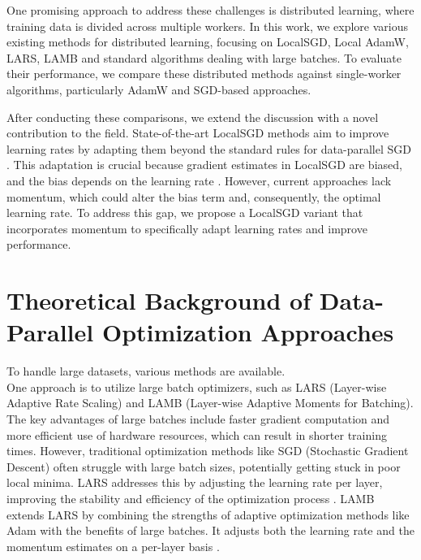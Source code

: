 \documentclass[10pt,twocolumn,letterpaper]{article}
\begin{document}
One promising approach to address these challenges is distributed learning, where training data is divided across multiple workers. In this work, we explore various existing methods for distributed learning, focusing on LocalSGD, Local AdamW, LARS, LAMB and standard algorithms dealing with large batches. To evaluate their performance, we compare these distributed methods against single-worker algorithms, particularly AdamW and SGD-based approaches.

After conducting these comparisons, we extend the discussion with a novel contribution to the field. State-of-the-art LocalSGD methods aim to improve learning rates by adapting them beyond the standard rules for data-parallel SGD \cite{BALLES2024P}. This adaptation is crucial because gradient estimates in LocalSGD are biased, and the bias depends on the learning rate \cite{BALLES2024P}. However, current approaches lack momentum, which could alter the bias term and, consequently, the optimal learning rate. To address this gap, we propose a LocalSGD variant that incorporates momentum to specifically adapt learning rates and improve performance.


\section{Theoretical Background of Data-Parallel Optimization Approaches}

To handle large datasets, various methods are available.\\
One approach is to utilize large batch optimizers, such as LARS (Layer-wise Adaptive Rate Scaling) and LAMB (Layer-wise Adaptive Moments for Batching). The key advantages of large batches include faster gradient computation and more efficient use of hardware resources, which can result in shorter training times. However, traditional optimization methods like SGD (Stochastic Gradient Descent) often struggle with large batch sizes, potentially getting stuck in poor local minima. LARS addresses this by adjusting the learning rate per layer, improving the stability and efficiency of the optimization process \cite{you2017largebatchtrainingconvolutional}. LAMB extends LARS by combining the strengths of adaptive optimization methods like Adam with the benefits of large batches. It adjusts both the learning rate and the momentum estimates on a per-layer basis \cite{you2020largebatchoptimizationdeep}.\\
\end{document}
